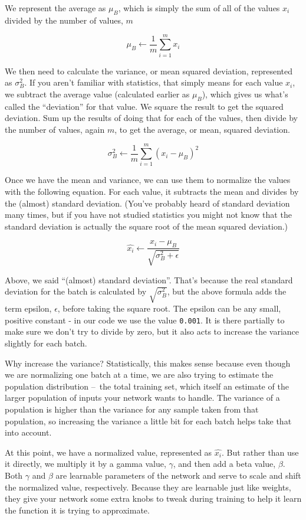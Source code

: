 \documentclass[11pt]{article}
\begin{document}
We represent the average as \(\mu_B\), which is simply the sum of all of
the values \(x_i\) divided by the number of values, \(m\)

\[
\mu_B \leftarrow \frac{1}{m}\sum_{i=1}^m x_i
\]

We then need to calculate the variance, or mean squared deviation,
represented as \(\sigma_{B}^{2}\). If you aren't familiar with
statistics, that simply means for each value \(x_i\), we subtract the
average value (calculated earlier as \(\mu_B\)), which gives us what's
called the ``deviation'' for that value. We square the result to get the
squared deviation. Sum up the results of doing that for each of the
values, then divide by the number of values, again \(m\), to get the
average, or mean, squared deviation.

\[
\sigma_{B}^{2} \leftarrow \frac{1}{m}\sum_{i=1}^m (x_i - \mu_B)^2
\]

Once we have the mean and variance, we can use them to normalize the
values with the following equation. For each value, it subtracts the
mean and divides by the (almost) standard deviation. (You've probably
heard of standard deviation many times, but if you have not studied
statistics you might not know that the standard deviation is actually
the square root of the mean squared deviation.)

\[
\hat{x_i} \leftarrow \frac{x_i - \mu_B}{\sqrt{\sigma_{B}^{2} + \epsilon}}
\]

Above, we said ``(almost) standard deviation''. That's because the real
standard deviation for the batch is calculated by
\(\sqrt{\sigma_{B}^{2}}\), but the above formula adds the term epsilon,
\(\epsilon\), before taking the square root. The epsilon can be any
small, positive constant - in our code we use the value \texttt{0.001}.
It is there partially to make sure we don't try to divide by zero, but
it also acts to increase the variance slightly for each batch.

Why increase the variance? Statistically, this makes sense because even
though we are normalizing one batch at a time, we are also trying to
estimate the population distribution --~the total training set, which
itself an estimate of the larger population of inputs your network wants
to handle. The variance of a population is higher than the variance for
any sample taken from that population, so increasing the variance a
little bit for each batch helps take that into account.

At this point, we have a normalized value, represented as \(\hat{x_i}\).
But rather than use it directly, we multiply it by a gamma value,
\(\gamma\), and then add a beta value, \(\beta\). Both \(\gamma\) and
\(\beta\) are learnable parameters of the network and serve to scale and
shift the normalized value, respectively. Because they are learnable
just like weights, they give your network some extra knobs to tweak
during training to help it learn the function it is trying to
approximate.
\end{document}
